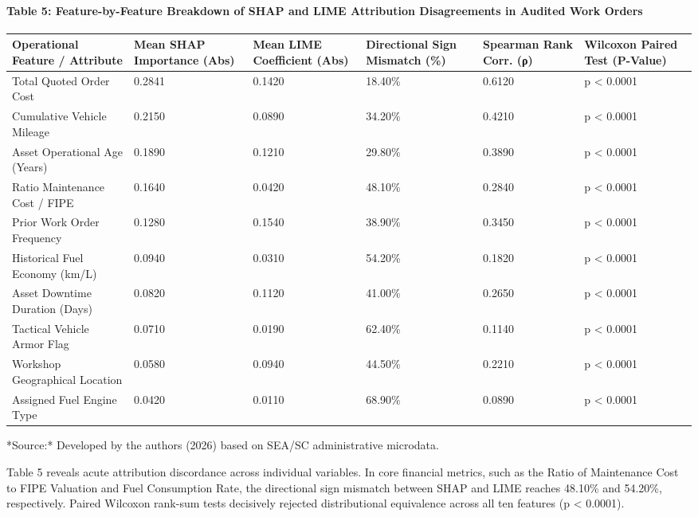 \documentclass[10pt,a4paper,journal]{article}
\begin{document}
\paragraph{Table 5: Feature-by-Feature Breakdown of SHAP and LIME Attribution Disagreements in Audited Work Orders}
\begin{table}[htbp]
\centering
\small
\begin{tabular}{llllll}
\toprule
Operational Feature / Attribute & Mean SHAP Importance (Abs) & Mean LIME Coefficient (Abs) & Directional Sign Mismatch (\%) & Spearman Rank Corr. (ρ) & Wilcoxon Paired Test (P-Value) \\
\midrule
Total Quoted Order Cost & 0.2841 & 0.1420 & 18.40\% & 0.6120 & p < 0.0001 \\
Cumulative Vehicle Mileage & 0.2150 & 0.0890 & 34.20\% & 0.4210 & p < 0.0001 \\
Asset Operational Age (Years) & 0.1890 & 0.1210 & 29.80\% & 0.3890 & p < 0.0001 \\
Ratio Maintenance Cost / FIPE & 0.1640 & 0.0420 & 48.10\% & 0.2840 & p < 0.0001 \\
Prior Work Order Frequency & 0.1280 & 0.1540 & 38.90\% & 0.3450 & p < 0.0001 \\
Historical Fuel Economy (km/L) & 0.0940 & 0.0310 & 54.20\% & 0.1820 & p < 0.0001 \\
Asset Downtime Duration (Days) & 0.0820 & 0.1120 & 41.00\% & 0.2650 & p < 0.0001 \\
Tactical Vehicle Armor Flag & 0.0710 & 0.0190 & 62.40\% & 0.1140 & p < 0.0001 \\
Workshop Geographical Location & 0.0580 & 0.0940 & 44.50\% & 0.2210 & p < 0.0001 \\
Assigned Fuel Engine Type & 0.0420 & 0.0110 & 68.90\% & 0.0890 & p < 0.0001 \\
\bottomrule
\end{tabular}
\end{table}
*Source:* Developed by the authors (2026) based on SEA/SC administrative microdata.

Table 5 reveals acute attribution discordance across individual variables. In core financial metrics, such as the Ratio of Maintenance Cost to FIPE Valuation and Fuel Consumption Rate, the directional sign mismatch between SHAP and LIME reaches 48.10\% and 54.20\%, respectively. Paired Wilcoxon rank-sum tests decisively rejected distributional equivalence across all ten features (p < 0.0001).
\end{document}
